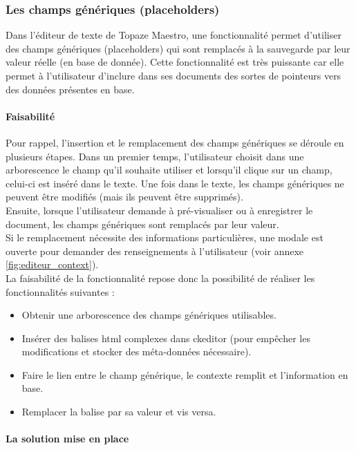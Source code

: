 \subsubsection{Les champs génériques (placeholders)}
Dans l'éditeur de texte de Topaze Maestro, une fonctionnalité permet d'utiliser des champs génériques (placeholders) qui sont remplacés à la sauvegarde par leur valeur réelle (en base de donnée). Cette fonctionnalité est très puissante car elle permet à l'utilisateur d'inclure dans ses documents des sortes de pointeurs vers des données présentes en base. 

\paragraph*{Faisabilité\\}
Pour rappel, l'insertion et le remplacement des champs génériques se déroule en plusieurs étapes. Dans un premier temps, l'utilisateur choisit dans une arborescence le champ qu'il souhaite utiliser et lorsqu'il clique sur un champ, celui-ci est inséré dans le texte.
Une fois dans le texte, les champs génériques ne peuvent être modifiés (mais ils peuvent être supprimés).\\
Ensuite, lorsque l'utilisateur demande à pré-visualiser ou à enregistrer le document, les champs génériques sont remplacés par leur valeur.\\
Si le remplacement nécessite des informations particulières, une modale est ouverte pour demander des renseignements à l'utilisateur (voir annexe \ref{fig:editeur_context}).\\
 
La faisabilité de la fonctionnalité repose donc la possibilité de réaliser les fonctionnalités suivantes : %
\begin{itemize}
\item Obtenir une arborescence des champs génériques utilisables.
\item Insérer des balises html complexes dans ckeditor (pour empêcher les modifications et stocker des méta-données nécessaire).
\item Faire le lien entre le champ générique, le contexte remplit et l'information en base.
\item Remplacer la balise par sa valeur et vis versa.
\end{itemize}

\paragraph*{La solution mise en place}

